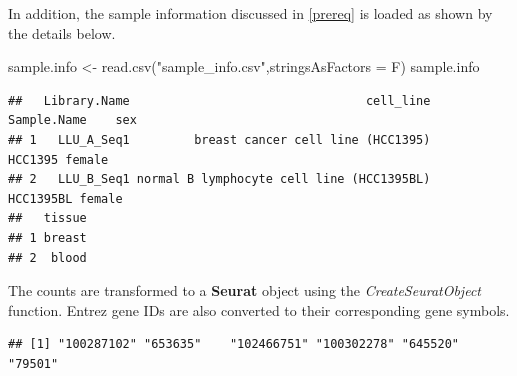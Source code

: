 \documentclass[
]{book}
\newenvironment{Shaded}{\begin{snugshade}}{\end{snugshade}}
\newcommand{\AttributeTok}[1]{\textcolor[rgb]{0.77,0.63,0.00}{#1}}
\newcommand{\CommentTok}[1]{\textcolor[rgb]{0.56,0.35,0.01}{\textit{#1}}}
\newcommand{\FunctionTok}[1]{\textcolor[rgb]{0.00,0.00,0.00}{#1}}
\newcommand{\NormalTok}[1]{#1}
\newcommand{\OtherTok}[1]{\textcolor[rgb]{0.56,0.35,0.01}{#1}}
\newcommand{\SpecialCharTok}[1]{\textcolor[rgb]{0.00,0.00,0.00}{#1}}
\newcommand{\StringTok}[1]{\textcolor[rgb]{0.31,0.60,0.02}{#1}}
\begin{document}
In addition, the sample information discussed in \ref{prereq} is loaded as shown by the details below.

\begin{Shaded}
\begin{Highlighting}[]
\NormalTok{sample.info }\OtherTok{\textless{}{-}} \FunctionTok{read.csv}\NormalTok{(}\StringTok{"sample\_info.csv"}\NormalTok{,}\AttributeTok{stringsAsFactors =}\NormalTok{ F)}
\NormalTok{sample.info}
\end{Highlighting}
\end{Shaded}

\begin{verbatim}
##   Library.Name                                 cell_line Sample.Name    sex
## 1   LLU_A_Seq1         breast cancer cell line (HCC1395)     HCC1395 female
## 2   LLU_B_Seq1 normal B lymphocyte cell line (HCC1395BL)   HCC1395BL female
##   tissue
## 1 breast
## 2  blood
\end{verbatim}

The counts are transformed to a \textbf{Seurat} object using the \emph{CreateSeuratObject} function. Entrez gene IDs are also converted to their corresponding gene symbols.

\begin{Shaded}
\end{Shaded}

\begin{verbatim}
## [1] "100287102" "653635"    "102466751" "100302278" "645520"    "79501"
\end{verbatim}

\begin{Shaded}
\end{Shaded}
\end{document}
